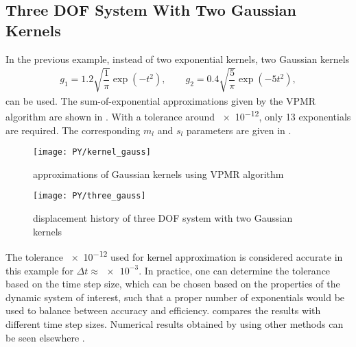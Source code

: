 \subsection{Three DOF System With Two Gaussian Kernels}
In the previous example, instead of two exponential kernels, two Gaussian kernels
\begin{gather}
g_1=1.2\sqrt{\dfrac{1}{\pi}}\exp\left(-t^2\right),\qquad
g_2=0.4\sqrt{\dfrac{5}{\pi}}\exp\left(-5t^2\right),
\end{gather}
can be used. The sum-of-exponential approximations given by the VPMR algorithm are shown in . With a  tolerance around \num{e-12}, only \num{13} exponentials are required. The corresponding $m_l$ and $s_l$ parameters are given in .
\begin{figure}[H]
\centering
\texttt{[image: PY/kernel\_gauss]}
\caption{approximations of Gaussian kernels using VPMR algorithm}\label{fig:vpmr}
\end{figure}

\begin{figure}[H]
\centering
\texttt{[image: PY/three\_gauss]}
\caption{displacement history of three DOF system with two Gaussian kernels}\label{fig:three_gauss}
\end{figure}
The tolerance \num{e-12} used for kernel approximation is considered accurate in this example for $\Delta{}t\approx\num{e-3}$. In practice, one can determine the tolerance based on the time step size, which can be chosen based on the properties of the dynamic system of interest, such that a proper number of exponentials would be used to balance between accuracy and efficiency.  compares the results with different time step sizes. Numerical results obtained by using other methods can be seen elsewhere \citep{Shen2021}.


